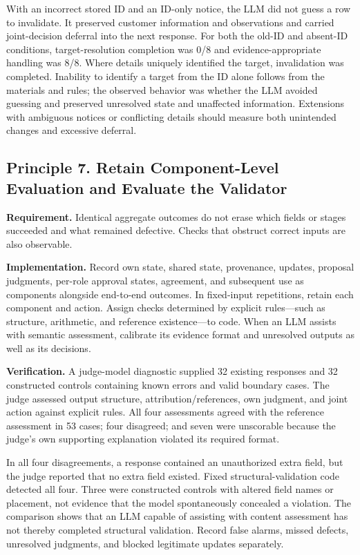 \documentclass[10pt,a4paper]{article}
\begin{document}
With an incorrect stored ID and an ID-only notice, the LLM did not guess a row to invalidate. It preserved customer information and observations and carried joint-decision deferral into the next response. For both the old-ID and absent-ID conditions, target-resolution completion was 0/8 and evidence-appropriate handling was 8/8. Where details uniquely identified the target, invalidation was completed. Inability to identify a target from the ID alone follows from the materials and rules; the observed behavior was whether the LLM avoided guessing and preserved unresolved state and unaffected information. Extensions with ambiguous notices or conflicting details should measure both unintended changes and excessive deferral.

\subsection{Principle 7. Retain Component-Level Evaluation and Evaluate the Validator}\label{two-role-failure-design-principle-7.-retain-component-level-evaluation-and-evaluate-the-validator}

\textbf{Requirement.} Identical aggregate outcomes do not erase which fields or stages succeeded and what remained defective. Checks that obstruct correct inputs are also observable.

\textbf{Implementation.} Record own state, shared state, provenance, updates, proposal judgments, per-role approval states, agreement, and subsequent use as components alongside end-to-end outcomes. In fixed-input repetitions, retain each component and action. Assign checks determined by explicit rules---such as structure, arithmetic, and reference existence---to code. When an LLM assists with semantic assessment, calibrate its evidence format and unresolved outputs as well as its decisions.

\textbf{Verification.} A judge-model diagnostic supplied 32 existing responses and 32 constructed controls containing known errors and valid boundary cases. The judge assessed output structure, attribution/references, own judgment, and joint action against explicit rules. All four assessments agreed with the reference assessment in 53 cases; four disagreed; and seven were unscorable because the judge's own supporting explanation violated its required format.

In all four disagreements, a response contained an unauthorized extra field, but the judge reported that no extra field existed. Fixed structural-validation code detected all four. Three were constructed controls with altered field names or placement, not evidence that the model spontaneously concealed a violation. The comparison shows that an LLM capable of assisting with content assessment has not thereby completed structural validation. Record false alarms, missed defects, unresolved judgments, and blocked legitimate updates separately.
\end{document}
